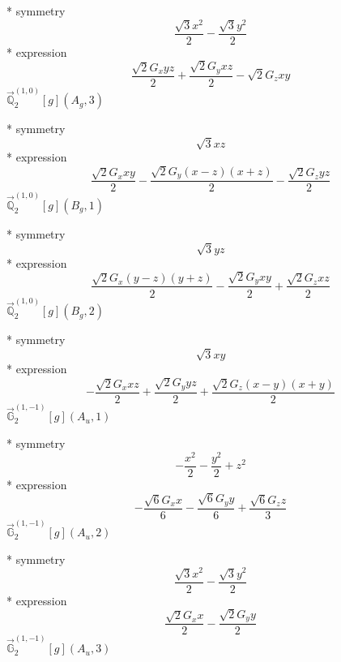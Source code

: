 \documentclass[fleqn,8pt]{jsarticle}
\begin{document}
\noindent\quad ** symmetry
\begin{dmath*}
\frac{\sqrt{3} x^{2}}{2} - \frac{\sqrt{3} y^{2}}{2}
\end{dmath*}
\noindent\quad ** expression
\begin{dmath*}
\frac{\sqrt{2} G_{x} y z}{2} + \frac{\sqrt{2} G_{y} x z}{2} - \sqrt{2} G_{z} x y
\end{dmath*}
\noindent\quad $\vec{\mathbb{Q}}_{2}^{(1,0)}[g](A_{g},3)$

\noindent\quad ** symmetry
\begin{dmath*}
\sqrt{3} x z
\end{dmath*}
\noindent\quad ** expression
\begin{dmath*}
\frac{\sqrt{2} G_{x} x y}{2} - \frac{\sqrt{2} G_{y} \left(x - z\right) \left(x + z\right)}{2} - \frac{\sqrt{2} G_{z} y z}{2}
\end{dmath*}
\noindent\quad $\vec{\mathbb{Q}}_{2}^{(1,0)}[g](B_{g},1)$

\noindent\quad ** symmetry
\begin{dmath*}
\sqrt{3} y z
\end{dmath*}
\noindent\quad ** expression
\begin{dmath*}
\frac{\sqrt{2} G_{x} \left(y - z\right) \left(y + z\right)}{2} - \frac{\sqrt{2} G_{y} x y}{2} + \frac{\sqrt{2} G_{z} x z}{2}
\end{dmath*}
\noindent\quad $\vec{\mathbb{Q}}_{2}^{(1,0)}[g](B_{g},2)$

\noindent\quad ** symmetry
\begin{dmath*}
\sqrt{3} x y
\end{dmath*}
\noindent\quad ** expression
\begin{dmath*}
- \frac{\sqrt{2} G_{x} x z}{2} + \frac{\sqrt{2} G_{y} y z}{2} + \frac{\sqrt{2} G_{z} \left(x - y\right) \left(x + y\right)}{2}
\end{dmath*}
\noindent\quad $\vec{\mathbb{G}}_{2}^{(1,-1)}[g](A_{u},1)$

\noindent\quad ** symmetry
\begin{dmath*}
- \frac{x^{2}}{2} - \frac{y^{2}}{2} + z^{2}
\end{dmath*}
\noindent\quad ** expression
\begin{dmath*}
- \frac{\sqrt{6} G_{x} x}{6} - \frac{\sqrt{6} G_{y} y}{6} + \frac{\sqrt{6} G_{z} z}{3}
\end{dmath*}
\noindent\quad $\vec{\mathbb{G}}_{2}^{(1,-1)}[g](A_{u},2)$

\noindent\quad ** symmetry
\begin{dmath*}
\frac{\sqrt{3} x^{2}}{2} - \frac{\sqrt{3} y^{2}}{2}
\end{dmath*}
\noindent\quad ** expression
\begin{dmath*}
\frac{\sqrt{2} G_{x} x}{2} - \frac{\sqrt{2} G_{y} y}{2}
\end{dmath*}
\noindent\quad $\vec{\mathbb{G}}_{2}^{(1,-1)}[g](A_{u},3)$
\end{document}

